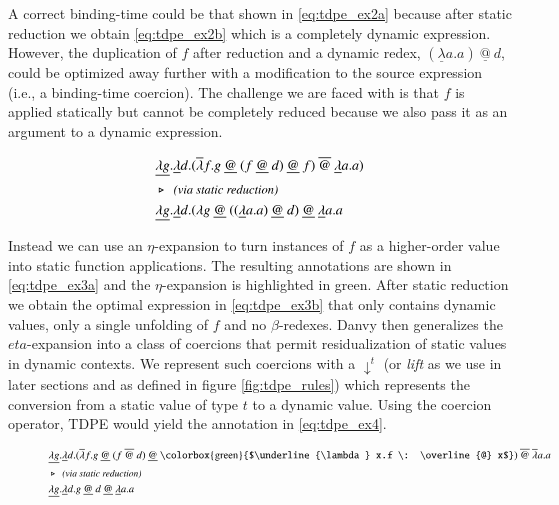 \documentclass[a4paper,12pt,twoside,openright]{report}
\theoremstyle{definition}
\begin{document}
A correct binding-time could be that shown in \eqref{eq:tdpe_ex2a} because after static reduction we obtain \eqref{eq:tdpe_ex2b} which is a completely dynamic expression. However, the duplication of $f$ after reduction and a dynamic redex, $(\underline{\lambda}a.a) \: \underline{@} \: d$, could be optimized away further with a modification to the source expression (i.e., a binding-time coercion). The challenge we are faced with is that $f$ is applied statically but cannot be completely reduced because we also pass it as an argument to a dynamic expression.
\begin{figure}[hbp!]
    \begin{align}
        & \underline{\lambda g}.\underline{\lambda} d.(\overline{\lambda} f.g \: \underline{@} \: (f \: \underline{@} \: d) \: \underline{@} \: f) \: \overline{@} \: \underline{\lambda} a.a) \label{eq:tdpe_ex2a} \\
        & \triangleright \:\: \emph{\small{\text{(via static reduction)}}} \nonumber \\
        & \underline{\lambda g}.\underline{\lambda} d.(\lambda g \: \underline{@} \: ((\underline{\lambda} a.a) \: \underline{@} \: d) \: \underline{@} \: \underline{\lambda} a.a \label{eq:tdpe_ex2b}
    \end{align}
\end{figure}

Instead we can use an $\eta$-expansion to turn instances of $f$ as a higher-order value into static function applications. The resulting annotations are shown in \eqref{eq:tdpe_ex3a} and the $\eta$-expansion is highlighted in green. After static reduction we obtain the optimal expression in \eqref{eq:tdpe_ex3b} that only contains dynamic values, only a single unfolding of $f$ and no $\beta$-redexes. Danvy then generalizes the $eta$-expansion into a class of coercions that permit residualization of static values in dynamic contexts. We represent such coercions with a $\downarrow^t$ (or \textit{lift} as we use in later sections and as defined in figure \ref{fig:tdpe_rules}) which represents the conversion from a static value of type $t$ to a dynamic value. Using the coercion operator, TDPE would yield the annotation in \eqref{eq:tdpe_ex4}.

\begin{figure}[htp!]
    \begin{align}
        & \underline{\lambda g}.\underline{\lambda} d.(\overline{\lambda}f.g \: \underline{@} \: (f \: \overline{@} \: d) \: \underline{@} \: \text{\colorbox{green}{$\underline{\lambda} x.f \: \overline{@} x$}}) \: \overline{@} \: \overline{\lambda} a.a \label{eq:tdpe_ex3a} \\
        & \triangleright \:\: \emph{\small{\text{(via static reduction)}}} \nonumber \\
        & \underline{\lambda g}.\underline{\lambda} d.g \: \underline{@} \: d \: \underline{@} \: \underline{\lambda} a.a \label{eq:tdpe_ex3b}
    \end{align}
\end{figure}
\end{document}
